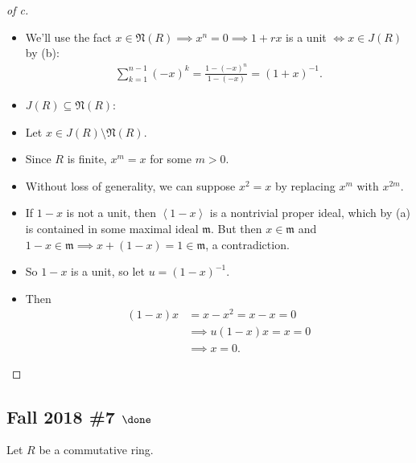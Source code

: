 \begin{solution}
\begin{proof}[of c]
\begin{itemize}
\item
  We'll use the fact
  \(x\in \mathfrak N(R) \implies x^n = 0 \implies 1 + rx\) is a unit
  \(\iff x\in J(R)\) by (b):
  \begin{align*}
  \sum_{k=1}^{n-1} (-x)^k = \frac{1 - (-x)^n}{1- (-x)} = (1+x)^{-1}
  .\end{align*}
\item
  \(J(R) \subseteq \mathfrak N(R)\):
\item
  Let \(x \in J(R) \setminus \mathfrak N(R)\).
\item
  Since \(R\) is finite, \(x^m = x\) for some \(m > 0\).
\item
  Without loss of generality, we can suppose \(x^2 = x\) by replacing
  \(x^m\) with \(x^{2m}\).
\item
  If \(1-x\) is not a unit, then \(\left\langle{1-x}\right\rangle\) is a
  nontrivial proper ideal, which by (a) is contained in some maximal
  ideal \({\mathfrak{m}}\). But then \(x\in {\mathfrak{m}}\) and
  \(1-x \in {\mathfrak{m}}\implies x + (1-x) = 1 \in {\mathfrak{m}}\), a
  contradiction.
\item
  So \(1-x\) is a unit, so let \(u = (1-x)^{-1}\).
\item
  Then
  \begin{align*}
  (1-x)x &= x - x^2 = x - x = 0 \\
  &\implies u (1-x)x = x = 0 \\
  &\implies x=0
  .\end{align*}
\end{itemize}

\end{proof}

\end{solution}

\hypertarget{fall-2018-7-done}{%
\subsection{\texorpdfstring{Fall 2018 \#7
\(\done\)}{Fall 2018 \#7 \textbackslash done}}\label{fall-2018-7-done}}

Let \(R\) be a commutative ring.


